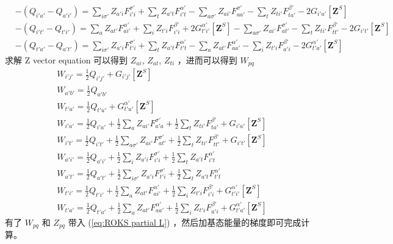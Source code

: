 \documentclass[11pt]{ctexart}
\numberwithin{equation}{section}
\begin{document}
\begin{equation}
    \begin{aligned}
        & -(Q_{i'a'}-Q_{a'i'}) 
        = \sum_{i\sigma'}Z_{a'i}F_{i'i}^{\sigma'}
        + \sum_{t}Z_{a't}F_{i't}^{\alpha'}
        - \sum_{a\sigma'}Z_{ai'}F_{aa'}^{\sigma'} 
        - \sum_{t}Z_{ti'}F_{ta'}^{\beta'}
        - 2G_{i'a'}[\mathbf{Z}^{S}] \\
        & -(Q_{i't'}-Q_{t'i'}) 
        = \sum_{a}Z_{at'}F_{ai'}^{\alpha'}
        + \sum_{i}Z_{t' i}F_{i' i}^{\beta'}
        + 2G_{t'i'}^{\alpha'}[\mathbf{Z}^{S}]
        - \sum_{a\sigma'}Z_{ai'}F_{at'}^{\sigma'}
        - \sum_{t}Z_{ti'}F_{tt'}^{\beta'}
        - 2G_{i't'}[\mathbf{Z}^{S}]\\
        & -(Q_{t'a'}-Q_{a't'})
        = \sum_{i\sigma'}Z_{a'i}F_{t'i}^{\sigma'}
        + \sum_{t}Z_{a't}F_{t't}^{\alpha'}
        - \sum_{a}Z_{at'}F_{aa'}^{\alpha'}
        - \sum_{i}Z_{t' i}F_{a' i}^{\beta'}
        - 2G_{t'a'}^{\alpha'}[\mathbf{Z}^{S}]
    \end{aligned}
\end{equation}
求解 Z vector equation 可以得到 $Z_{ai}$, $Z_{at}$, $Z_{ti}$ ，进而可以得到 $W_{pq}$
\begin{equation}
    \begin{aligned}
        & W_{i'j'} = \frac{1}{2}Q_{i'j'} + G_{i'j'}[\mathbf{Z}^{S}]\\
        & W_{a'b'} = \frac{1}{2}Q_{a'b'}\\
        & W_{t'u'} = \frac{1}{2}Q_{t'u'} + G_{t'u'}^{\alpha'}[\mathbf{Z}^{S}]\\
        & W_{i'a'} = \frac{1}{2}Q_{i'a'} + \frac{1}{2}\sum_{a}Z_{ai'}F_{a'a}^{\sigma'} + \frac{1}{2}\sum_{t}Z_{ti'}F_{ta'}^{\beta'} + G_{i'a'}[\mathbf{Z}^{S}]\\
        & W_{i't'} = \frac{1}{2}Q_{i't'} + \frac{1}{2}\sum_{a\sigma'}Z_{ai'}F_{at'}^{\sigma'} + \frac{1}{2}\sum_{t}Z_{ti'}F_{tt'}^{\beta'} + G_{i't'}[\mathbf{Z}^{S}]\\
        & W_{a'i'} = \frac{1}{2}Q_{a'i'} + \frac{1}{2}\sum_{i}Z_{a'i}F_{i'i}^{\sigma'} + \frac{1}{2}\sum_{t}Z_{a't}F_{i't}^{\alpha'}\\
        & W_{a't'} = \frac{1}{2}Q_{a't'} + \frac{1}{2}\sum_{i\sigma'}Z_{a'i}F_{t'i}^{\sigma'} + \frac{1}{2}\sum_{t}Z_{a't}F_{t't}^{\alpha'}\\
        & W_{t'i'} = \frac{1}{2}Q_{t'i'} + \frac{1}{2}\sum_{a}Z_{at'}F_{ai'}^{\alpha'} + \frac{1}{2}\sum_{i}Z_{t' i}F_{i' i}^{\beta'} + G_{t'i'}^{\alpha'}[\mathbf{Z}^{S}]\\
        & W_{t'a'} = \frac{1}{2}Q_{t'a'} + \frac{1}{2}\sum_{a}Z_{at'}F_{aa'}^{\alpha'} + \frac{1}{2}\sum_{i}Z_{t' i}F_{a' i}^{\beta'} + G_{t'a'}^{\alpha'}[\mathbf{Z}^{S}]
    \end{aligned}
\end{equation}
有了 $W_{pq}$ 和 $Z_{pq}$ 带入 (\ref{eq:ROKS partial L}) ，然后加基态能量的梯度即可完成计算。
\end{document}
